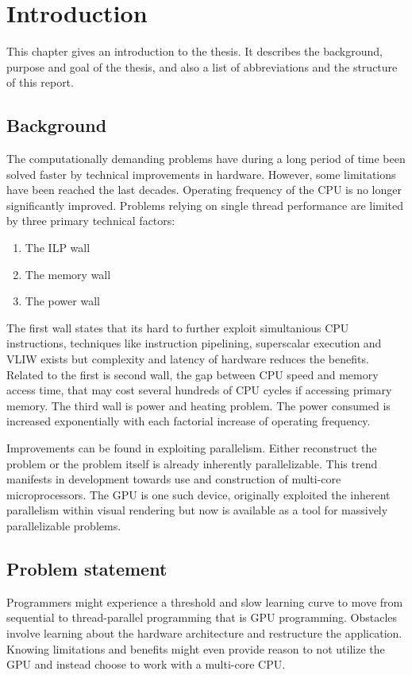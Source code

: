 \chapter{Introduction}\label{cha:intro}
This chapter gives an introduction to the thesis. It describes the background, purpose and goal of the thesis, and also a list of abbreviations and the structure of this report.

\section{Background}
The computationally demanding problems have during a long period of time been solved faster by technical improvements in hardware. However, some limitations have been reached the last decades. Operating frequency of the \gls{CPU} is no longer significantly improved. Problems relying on single thread performance are limited by three primary technical factors:
\begin{enumerate}
	\item The \gls{ILP} wall
	\item The memory wall
	\item The power wall
\end{enumerate}

The first wall states that its hard to further exploit simultanious \gls{CPU} instructions, techniques like instruction pipelining, superscalar execution and \gls{VLIW} exists but complexity and latency of hardware reduces the benefits. Related to the first is second wall, the gap between \gls{CPU} speed and memory access time, that may cost several hundreds of \gls{CPU} cycles if accessing primary memory. The third wall is power and heating problem. The power consumed is increased exponentially with each factorial increase of operating frequency.

Improvements can be found in exploiting parallelism. Either reconstruct the problem or the problem itself is already inherently parallelizable. This trend manifests in development towards use and construction of multi-core microprocessors. The \gls{GPU} is one such device, originally exploited the inherent parallelism within visual rendering but now is available as a tool for massively parallelizable problems.

\section{Problem statement}
Programmers might experience a threshold and slow learning curve to move from sequential to thread-parallel programming that is \gls{GPU} programming. Obstacles involve learning about the hardware architecture and restructure the application. Knowing limitations and benefits might even provide reason to not utilize the \gls{GPU} and instead choose to work with a multi-core \gls{CPU}.

